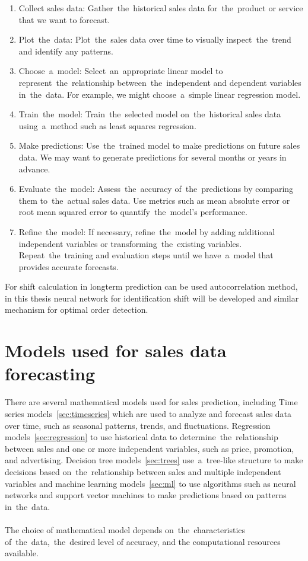 \begin{enumerate}
    \item Collect sales data: Gather~the~historical sales data for~the~product or service that we want to forecast.
    \item Plot~the~data: Plot~the~sales data over time to visually inspect~the~trend and identify any patterns.
    \item Choose~a~model: Select~an~appropriate linear model to represent~the~relationship between~the~independent and
    dependent variables in~the~data. For example, we might choose~a~simple linear regression model.
    \item Train~the~model: Train~the~selected model on~the~historical sales data using~a~method such as least squares
    regression.
    \item Make predictions: Use~the~trained model to make predictions on future sales data. We may want to generate
    predictions for several months or years in advance.
    \item Evaluate~the~model: Assess~the~accuracy of~the~predictions by comparing them to~the~actual sales data.
    Use metrics such as mean absolute error or root mean squared error to quantify~the~model's performance.
    \item Refine~the~model: If necessary, refine~the~model by adding additional independent variables or
    transforming~the~existing variables. Repeat~the~training and evaluation steps until we have~a~model that
    provides accurate forecasts.
\end{enumerate}
For shift calculation in longterm prediction can be used autocorrelation method, in this thesis neural network for
identification shift will be developed and similar mechanism for optimal order detection.

\section{Models used for sales data forecasting}\label{sec:models}
There are several mathematical models used for sales prediction, including Time series models~\ref{sec:timeseries} which are used to analyze and forecast sales data over time, such as seasonal patterns, trends, and fluctuations. Regression models~\ref{sec:regression} to use historical data to determine~the~relationship between sales and one or more independent variables, such as price, promotion, and advertising. Decision tree models~\ref{sec:trees} use~a~tree-like structure to make decisions based on~the~relationship between sales and multiple independent variables and machine learning models~\ref{sec:ml} to use algorithms such as neural networks and support vector machines to make predictions based on patterns in~the~data. \\
\\
The choice of mathematical model depends on~the~characteristics of~the~data,~the~desired level of accuracy, and the
computational resources available.
\\

